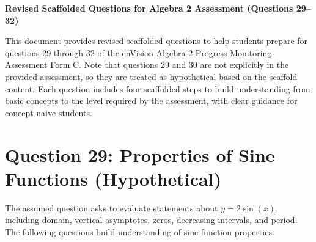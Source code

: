 \documentclass[12pt]{article}
\begin{document}
\begin{center}
    \textbf{Revised Scaffolded Questions for Algebra 2 Assessment (Questions 29--32)}
\end{center}

This document provides revised scaffolded questions to help students prepare for questions 29 through 32 of the enVision Algebra 2 Progress Monitoring Assessment Form C. Note that questions 29 and 30 are not explicitly in the provided assessment, so they are treated as hypothetical based on the scaffold content. Each question includes four scaffolded steps to build understanding from basic concepts to the level required by the assessment, with clear guidance for concept-naive students.

\section*{Question 29: Properties of Sine Functions (Hypothetical)}
The assumed question asks to evaluate statements about \( y = 2\sin(x) \), including domain, vertical asymptotes, zeros, decreasing intervals, and period. The following questions build understanding of sine function properties.
\end{document}
